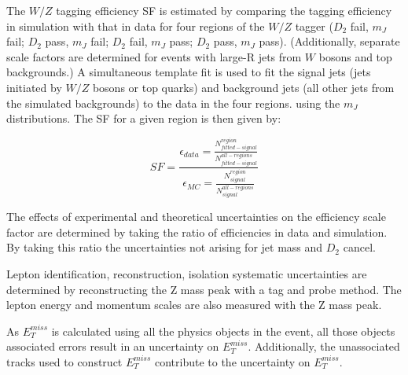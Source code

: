 The $W/Z$ tagging efficiency SF is estimated by comparing the tagging efficiency in simulation with that in data for four regions of the $W/Z$ tagger ($D_{2}$ fail, $m_{J}$ fail; $D_{2}$ pass, $m_{J}$ fail; $D_{2}$ fail, $m_{J}$ pass; $D_{2}$ pass, $m_{J}$ pass). (Additionally, separate scale factors are determined for events with large-R jets from $W$ bosons and top backgrounds.) A simultaneous template fit is used to fit the signal jets (jets initiated by $W/Z$ bosons or top quarks) and background jets (all other jets from the simulated backgrounds) to the data in the four regions. using the $m_{J}$ distributions. The SF for a given region is then given by:

\begin{equation}
SF = \frac{ \epsilon_{data} = \frac{ N^{region}_{fitted-signal }}{N^{all-regions}_{fitted-signal}}}    {  \epsilon_{MC} = \frac{N^{region}_{signal}}{N^{all-regions}_{signal}}}  
\end{equation}
 
The effects of experimental and theoretical uncertainties on the efficiency scale factor are determined by taking the ratio of efficiencies in data and simulation. By taking this ratio the uncertainties not arising for jet mass and $D_{2}$ cancel. 

Lepton identification, reconstruction, isolation systematic uncertainties are determined by reconstructing the Z mass peak with a tag and probe method. The lepton energy and momentum scales are also measured with the Z mass peak.

As $E_{T}^{miss}$ is calculated using all the physics objects in the event, all those objects associated errors result in an uncertainty on $E_{T}^{miss}$. Additionally, the unassociated tracks used to construct $E_{T}^{miss}$ contribute to the uncertainty on $E_{T}^{miss}$. 


